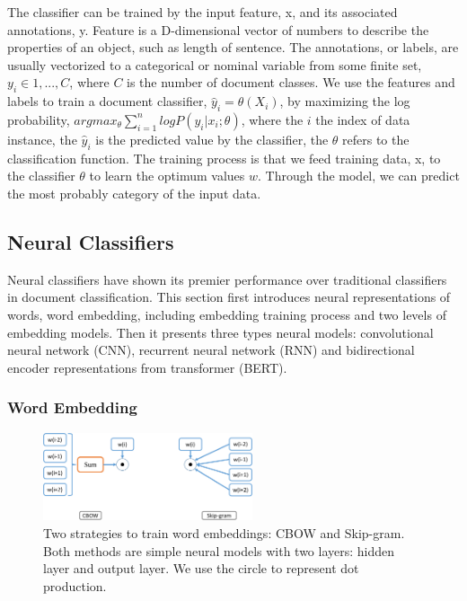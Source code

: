The classifier can be trained by the input feature, x, and its associated annotations, y. Feature is a D-dimensional vector of numbers to describe the properties of an object, such as length of sentence. The annotations, or labels, are usually vectorized to  a categorical or nominal variable from some finite set, $y_i \in {1,...,C}$, where $C$ is the number of document classes. We use the features and labels to train a document classifier, $\hat{y}_i = \theta(X_i)$, by maximizing the log probability, $argmax_{\theta}\sum_{i=1}^nlog P(y_i | x_i; \theta)$, where the $i$ the index of data instance, the $\hat{y}_i$ is the predicted value by the classifier, the $\theta$ refers to the classification function. The training process is that we feed training data, x, to the classifier $\theta$ to learn the optimum values $w$. Through the model, we can predict the most probably category of the input data.


\subsection{Neural Classifiers}

Neural classifiers have shown its premier performance over traditional classifiers in document classification.
This section first introduces neural representations of words, word embedding, including embedding training process and two levels of embedding models.
Then it presents three types neural models: convolutional neural network (CNN), recurrent neural network (RNN) and bidirectional encoder representations from transformer (BERT).

\subsubsection{Word Embedding}
\label{chap2:subsubsec:emb}

\begin{figure}[t!]
\centering
\includegraphics[width=0.55\textwidth]{images/chapter2/word2vec.pdf}
\caption{Two strategies to train word embeddings: CBOW and Skip-gram. Both methods are simple neural models with two layers: hidden layer and output layer. We use the circle to represent dot production.}
\label{chap2:fig:embd}
\end{figure}


